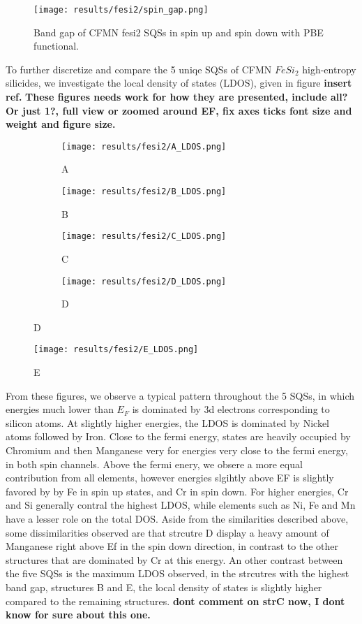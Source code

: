 \begin{figure}[H]
\centering
\texttt{[image: results/fesi2/spin\_gap.png]}
\caption{Band gap of CFMN fesi2 SQSs in spin up and spin down with PBE functional.}
\label{DOS_hse06_B}
\end{figure}

To further discretize and compare the 5 uniqe SQSs of CFMN $FeSi_2$ high-entropy silicides, we investigate the local density of states (LDOS), given in figure \textbf{insert ref.} \textbf{These figures needs work for how they are presented, include all? Or just 1?, full view or zoomed around EF, fix axes ticks font size and weight and figure size.}

\begin{figure}[H]
\centering
	\begin{subfigure}{\textwidth}
		\texttt{[image: results/fesi2/A\_LDOS.png]}
		\caption{A}
	\end{subfigure}
	\begin{subfigure}{\textwidth}
		\texttt{[image: results/fesi2/B\_LDOS.png]}
		\caption{B}
	\end{subfigure}
	\begin{subfigure}{\textwidth}
		\texttt{[image: results/fesi2/C\_LDOS.png]}
		\caption{C}
	\end{subfigure}
	\begin{subfigure}{\textwidth}
		\texttt{[image: results/fesi2/D\_LDOS.png]}
		\caption{D}
	\end{subfigure}
\end{figure}		
\begin{figure}[H]
	\centering	
	\texttt{[image: results/fesi2/E\_LDOS.png]}
	\caption{E}
\end{figure}

From these figures, we observe a typical pattern throughout the 5 SQSs, in which energies much lower than $E_F$ is dominated by 3d electrons corresponding to silicon atoms. At slightly higher energies, the LDOS is dominated by Nickel atoms followed by Iron. Close to the fermi energy, states are heavily occupied by Chromium and then Manganese very for energies very close to the fermi energy, in both spin channels. Above the fermi enery, we obsere a more equal contribution from all elements, however energies slgihtly above EF is slightly favored by by Fe in spin up states, and Cr in spin down. For higher energies, Cr and Si generally contral the highest LDOS, while elements such as Ni, Fe and Mn have  a lesser role on the total DOS. Aside from the similarities described above, some dissimilarities observed are that strcutre D display a heavy amount of Manganese right above Ef in the spin down direction, in contrast to the other structures that are dominated by Cr at this energy. An other contrast between the five SQSs is the maximum LDOS observed, in the strcutres with the highest band gap, structures B and E, the local density of states is slightly higher compared to the remaining structures. \textbf{dont comment on strC now, I dont know for sure about this one.} 

